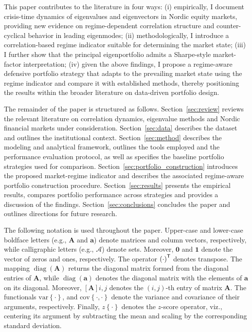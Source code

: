 \documentclass[pdflatex,sn-basic]{sn-jnl}%
\theoremstyle{thmstyleone}%
\theoremstyle{thmstyletwo}%
\theoremstyle{thmstylethree}%
\newcommand{\ba}{\boldsymbol{a}}
\newcommand{\bA}{\boldsymbol{A}}
\newcommand{\calA}{\mathcal{A}}
\DeclareMathOperator{\diag}{diag}
\newcommand{\T}{\textnormal{\textsf{T}}}
\newcommand{\bone}{\boldsymbol{1}}
\newcommand{\bzero}{\boldsymbol{0}}
\newcommand{\brc}[1]{\left( #1 \right)}
\newcommand{\sqbrc}[1]{\left[ #1 \right]}
\newcommand{\figbrc}[1]{\left\{ #1 \right\} }
\begin{document}
This paper contributes to the literature in four ways: 
(i) empirically, I document crisis-time dynamics of eigenvalues and eigenvectors in Nordic equity markets, 
providing new evidence on regime-dependent correlation structure and counter-cyclical behavior in leading eigenmodes;
(ii) methodologically, I introduce a correlation-based regime indicator suitable for determining the market state;
(iii) I further show that the principal eigenportfolio admits a Sharpe-style market-factor interpretation;
(iv) given the above findings, I propose a regime-aware defensive portfolio strategy that adapts to the 
prevailing market state using the regime indicator and compare it with established 
methods, thereby positioning the results within the broader literature on data-driven portfolio design.

The remainder of the paper is structured as follows. 
Section~\ref{sec:review} reviews the relevant literature on correlation dynamics, eigenvalue methods and Nordic financial markets under consideration. 
Section~\ref{sec:data} describes the dataset and outlines the institutional context. 
Section~\ref{sec:method} describes the modeling and analytical framework, outlines the tools employed and the performance evaluation protocol, as well as specifies the baseline portfolio strategies used for comparison.
Section~\ref{sec:portfolio_construction} introduces the proposed market-regime indicator and describes the associated regime-aware portfolio construction procedure.
Section~\ref{sec:results} presents the empirical results, compares portfolio performance across strategies and provides a discussion of the findings.
Section~\ref{sec:conclusions} concludes the paper and outlines directions for future research.

The following notation is used throughout the paper. Upper-case and lower-case boldface letters (e.g., $\bA$ and $\ba$) denote matrices and column vectors, respectively, while calligraphic letters (e.g., $\calA$) denote sets. Moreover, $\bzero$ and $\bone$ denote the vector of zeros and ones, respectively. The operator $\brc{\cdot}^{\T}$ denotes transpose. The mapping $\diag\brc{\bA}$ returns the diagonal matrix formed from the diagonal entries of $\bA$, while $\diag\brc{\ba}$ denotes the diagonal matrix with the elements of $\ba$ on its diagonal. Moreover, $\sqbrc{\bA}{i,j}$ denotes the $(i,j)$-th entry of matrix $\bA$. The functionals $\mathrm{var}\figbrc{\cdot}$, and $\mathrm{cov}\figbrc{\cdot,\cdot}$ denote the variance and covariance of their arguments, respectively. Finally, $z\figbrc{\cdot}$ denotes the $z$-score operator, viz., centering its argument by subtracting the mean and scaling by the corresponding standard deviation.
\end{document}
